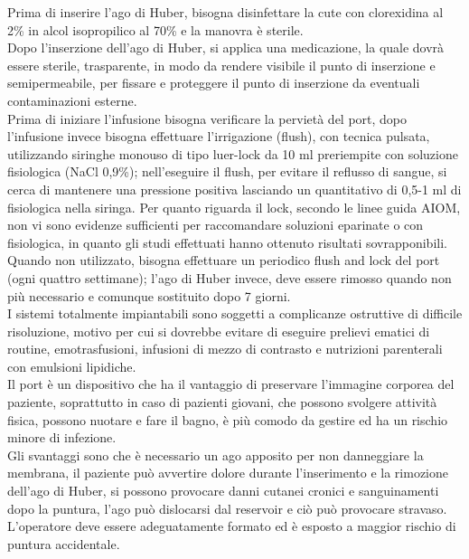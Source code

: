 Prima di inserire l'ago di Huber, bisogna disinfettare la cute con clorexidina al 2\% in alcol isopropilico al 70\% 
e la manovra è sterile\cite{GAVECELTracc2021}.\\
Dopo l'inserzione dell'ago di Huber, si applica una medicazione, la quale dovrà essere sterile, trasparente, 
in modo da rendere visibile il punto di inserzione e semipermeabile, per fissare e proteggere il punto di inserzione 
da eventuali contaminazioni esterne.\\ Prima di iniziare l'infusione bisogna verificare la pervietà del port, 
dopo l'infusione invece bisogna effettuare l'irrigazione (flush), con tecnica pulsata, 
utilizzando siringhe monouso di tipo luer-lock da 10 ml preriempite con soluzione fisiologica (NaCl 0,9\%); 
nell'eseguire il flush, per evitare il reflusso di sangue, si cerca di mantenere una pressione positiva lasciando 
un quantitativo di 0,5-1 ml di fisiologica nella siringa. 
Per quanto riguarda il lock, secondo le linee guida AIOM\cite{AIOMCVC}, non vi sono evidenze sufficienti per raccomandare 
soluzioni eparinate o con fisiologica, in quanto gli studi effettuati hanno ottenuto risultati sovrapponibili.\\
Quando non utilizzato, bisogna effettuare un periodico flush and lock del port (ogni quattro settimane); l'ago di Huber
invece, deve essere rimosso quando non più necessario e comunque sostituito dopo 7 giorni.\\ I sistemi totalmente 
impiantabili sono soggetti a complicanze ostruttive di difficile risoluzione, motivo per cui si dovrebbe evitare di 
eseguire prelievi ematici di routine, emotrasfusioni, infusioni di mezzo di contrasto e nutrizioni parenterali 
con emulsioni lipidiche\cite{GAVECELTracc2021}.\\
Il port è un dispositivo che ha il vantaggio di preservare l'immagine corporea del paziente, soprattutto in caso di 
pazienti giovani, che possono svolgere attività fisica, possono nuotare e fare il bagno, è più comodo da gestire ed ha un 
rischio minore di infezione.\\ 
Gli svantaggi sono che è necessario un ago apposito per non danneggiare la membrana, il paziente può avvertire dolore 
durante l'inserimento e la rimozione dell'ago di Huber, si possono provocare danni cutanei cronici e sanguinamenti 
dopo la puntura, l'ago può dislocarsi dal reservoir e ciò può provocare stravaso. L'operatore deve essere 
adeguatamente formato ed è esposto a maggior rischio di puntura accidentale\cite{LINEEGUIDA}.

